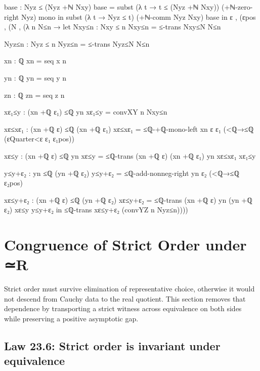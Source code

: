 \documentclass[11pt,a4paper]{book}
\def\mathbb#1{#1}%
\def\texorpdfstring#1#2{#2}%
\begin{document}
\begin{code}
{            base : Nyz ≤ (Nyz +ℕ Nxy)
            base = subst (λ t → t ≤ (Nyz +ℕ Nxy)) (+ℕ-zero-right Nyz) mono
          in
          subst (λ t → Nyz ≤ t) (+ℕ-comm Nyz Nxy) base
      in
      ε , (εpos ,
        (N , (λ n N≤n →
          let
            Nxy≤n : Nxy ≤ n
            Nxy≤n = ≤-trans Nxy≤N N≤n

            Nyz≤n : Nyz ≤ n
            Nyz≤n = ≤-trans Nyz≤N N≤n

            xn : ℚ
            xn = seq x n

            yn : ℚ
            yn = seq y n

            zn : ℚ
            zn = seq z n

            xε₁≤y : (xn +ℚ ε₁) ≤ℚ yn
            xε₁≤y = convXY n Nxy≤n

            xε≤xε₁ : (xn +ℚ ε) ≤ℚ (xn +ℚ ε₁)
            xε≤xε₁ =
              ≤ℚ-+ℚ-mono-left xn ε ε₁ (<ℚ→≤ℚ (εQuarter<ε ε₁ ε₁pos))

            xε≤y : (xn +ℚ ε) ≤ℚ yn
            xε≤y = ≤ℚ-trans {(xn +ℚ ε)} {(xn +ℚ ε₁)} {yn} xε≤xε₁ xε₁≤y

            y≤y+ε₂ : yn ≤ℚ (yn +ℚ ε₂)
            y≤y+ε₂ = ≤ℚ-add-nonneg-right yn ε₂ (<ℚ→≤ℚ ε₂pos)

            xε≤y+ε₂ : (xn +ℚ ε) ≤ℚ (yn +ℚ ε₂)
            xε≤y+ε₂ = ≤ℚ-trans {(xn +ℚ ε)} {yn} {(yn +ℚ ε₂)} xε≤y y≤y+ε₂
          in
            ≤ℚ-trans xε≤y+ε₂ (convYZ n Nyz≤n))))
  }

\end{code}


\section{Congruence of Strict Order under \texorpdfstring{$\simeq_{\mathbb{R}}$}{≃R}}

Strict order must survive elimination of representative choice, otherwise it would not descend from Cauchy data to the real quotient. This section removes that dependence by transporting a strict witness across equivalence on both sides while preserving a positive asymptotic gap.

\subsection*{Law 23.6: Strict order is invariant under equivalence}
\end{document}
